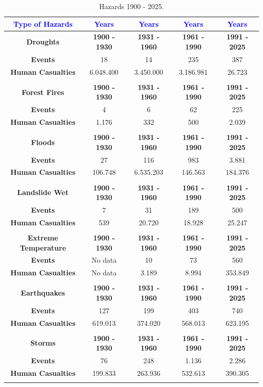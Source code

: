 \documentclass[12pt]{Definitions/academia}
\begin{document}
\begin{table}[H]
\begin{tabular}{|c|c|c|c|c|}
\hline
\textbf{\textcolor{blue}{Type of Hazards}} & \textbf{\textcolor{blue}{Years}} & \textbf{\textcolor{blue}{Years}} & \textbf{\textcolor{blue}{Years}} & \textbf{\textcolor{blue}{Years}}\tabularnewline
\hline
\hline
\textbf{Droughts} & \textbf{1900 - 1930} & \textbf{1931 - 1960} & \textbf{1961 - 1990} & \textbf{1991 - 2025}\tabularnewline
\hline
\textbf{Events} & 18 & 14 & 235 & 387\tabularnewline
\hline
\textbf{Human Casualties} & 6.048.400 & 3.450.000 & 3.186.981 & 26.723\tabularnewline
\hline
 &  &  &  & \tabularnewline
\hline
\textbf{Forest Fires} & \textbf{1900 - 1930} & \textbf{1931 - 1960} & \textbf{1961 - 1990} & \textbf{1991 - 2025}\tabularnewline
\hline
\textbf{Events} & 4 & 6 & 62 & 225\tabularnewline
\hline
\textbf{Human Casualties} & 1.176 & 332 & 500 & 2.039\tabularnewline
\hline
 &  &  &  & \tabularnewline
\hline
\textbf{Floods} & \textbf{1900 - 1930} & \textbf{1931 - 1960} & \textbf{1961 - 1990} & \textbf{1991 - 2025}\tabularnewline
\hline
\textbf{Events} & 27 & 116 & 983 & 3.881\tabularnewline
\hline
\textbf{Human Casualties} & 106.748 & 6.535.203 & 146.563 & 184.376\tabularnewline
\hline
 &  &  &  & \tabularnewline
\hline
\textbf{Landslide Wet} & \textbf{1900 - 1930} & \textbf{1931 - 1960} & \textbf{1961 - 1990} & \textbf{1991 - 2025}\tabularnewline
\hline
\textbf{Events} & 7 & 31 & 189 & 500\tabularnewline
\hline
\textbf{Human Casualties} & 539 & 20.720 & 18.928 & 25.247\tabularnewline
\hline
 &  &  &  & \tabularnewline
\hline
\textbf{Extreme Temperature} & \textbf{1900 - 1930} & \textbf{1931 - 1960} & \textbf{1961 - 1990} & \textbf{1991 - 2025}\tabularnewline
\hline
\textbf{Events} & No data & 10 & 73 & 560\tabularnewline
\hline
\textbf{Human Casualties} & No data & 3.189 & 8.994 & 353.849\tabularnewline
\hline
 &  &  &  & \tabularnewline
\hline
\textbf{Earthquakes} & \textbf{1900 - 1930} & \textbf{1931 - 1960} & \textbf{1961 - 1990} & \textbf{1991 - 2025}\tabularnewline
\hline
\textbf{Events} & 127 & 199 & 403 & 740\tabularnewline
\hline
\textbf{Human Casualties} & 619.013 & 374.020 & 568.013 & 623.195\tabularnewline
\hline
 &  &  &  & \tabularnewline
\hline
\textbf{Storms} & \textbf{1900 - 1930} & \textbf{1931 - 1960} & \textbf{1961 - 1990} & \textbf{1991 - 2025}\tabularnewline
\hline
\textbf{Events} & 76 & 248 & 1.136 & 2.286\tabularnewline
\hline
\textbf{Human Casualties} & 199.833 & 263.936 & 532.613 & 390.305\tabularnewline
\hline
 &  &  &  & \tabularnewline
\hline
\end{tabular}

\caption{Hazards 1900 - 2025.\label{tab:Table-1-Hazards-1900--}}

\end{table}
\end{document}
